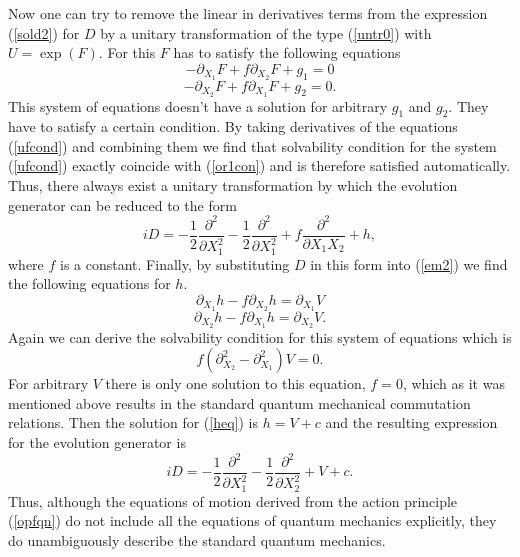 \documentclass[a4paper,11pt]{article}
\begin{document}
Now one can try to remove the linear in derivatives terms from the
expression (\ref{sold2}) for $D$ by a unitary transformation of
the type (\ref{untr0}) with $U=\exp (F)$. For this $F$ has to
satisfy the following equations
\begin{displaymath}
-\partial_{X_1}F+f\partial_{X_2}F+g_1=0
\end{displaymath}
\begin{equation}
-\partial_{X_2}F+f\partial_{X_1}F+g_2=0. \label{ufcond}
\end{equation}
This system of equations doesn't have a solution for arbitrary
$g_1$ and $g_2$. They have to satisfy a certain condition. By
taking derivatives of the equations (\ref{ufcond}) and combining
them we find that solvability condition for the system
(\ref{ufcond}) exactly coincide with (\ref{or1con}) and is
therefore satisfied automatically. Thus, there always exist a
unitary transformation by which the evolution generator can be
reduced to the form
\begin{equation}
iD=-\frac{1}{2}\frac{\partial^2}{\partial X_1^2}-
\frac{1}{2}\frac{\partial^2}{\partial X_1^2}+
f\frac{\partial^2}{\partial X_1 X_2 }+h, \label{sold2r}
\end{equation}
where $f$ is a constant. Finally, by substituting $D$ in this form
into (\ref{em2}) we find the following equations for $h$.
\begin{displaymath}
\partial_{X_1}h-f\partial_{X_2}h=\partial_{X_1}V
\end{displaymath}
\begin{equation}
\partial_{X_2}h-f\partial_{X_1}h=\partial_{X_2}V. \label{heq}
\end{equation}
Again we can derive the solvability condition for this system of
equations which is
\begin{equation}
f(\partial^2_{X_2}-\partial^2_{X_1})V=0. \label{hcond}
\end{equation}
For arbitrary $V$ there is only one solution to this equation,
$f=0$, which as it was mentioned above results in the standard
quantum mechanical commutation relations. Then the solution for
(\ref{heq}) is $h=V+c$ and the resulting expression for the
evolution generator is
\begin{equation}
iD=-\frac{1}{2}\frac{\partial^2}{\partial X_1^2}-
\frac{1}{2}\frac{\partial^2}{\partial X_2^2}+V+c. \label{sold2f}
\end{equation}
Thus, although the equations of motion derived from the action
principle (\ref{opfqn}) do not include all the equations of
quantum mechanics explicitly, they do unambiguously describe the
standard quantum mechanics.
\end{document}
